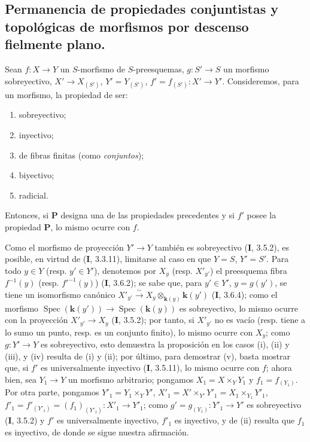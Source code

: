 \subsection{Permanencia de propiedades conjuntistas y topológicas de morfismos
por descenso fielmente plano.}
\label{subsection:IV.2.6-fr}

\begin{proposition}[2.6.1]
Sean $f:X\to Y$ un $S$-morfismo de $S$-preesquemas, $g:S'\to S$ un
morfismo sobreyectivo, $X'\to X_{(S')}$, $Y'=Y_{(S')}$,
$f'=f_{(S')}:X'\to Y'$. Consideremos, para un morfismo, la propiedad de ser:
\begin{enumerate}
\item[\textup{(i)}] sobreyectivo;
\item[\textup{(ii)}] inyectivo;
\item[\textup{(iii)}] de fibras finitas \textup{(como \emph{conjuntos})};
\item[\textup{(iv)}] biyectivo;
\item[\textup{(v)}] radicial.
\end{enumerate}
Entonces, si $\boldsymbol{P}$ designa una de las propiedades precedentes y si $f'$ posee la
propiedad $\boldsymbol{P}$, lo mismo ocurre con $f$.
\end{proposition}

Como el morfismo de proyección $Y'\to Y$ también es sobreyectivo (\textbf I, 3.5.2),
es posible, en virtud de (\textbf I, 3.3.11), limitarse al caso en que $Y=S$,
$Y'=S'$. Para todo $y\in Y$ (resp. $y'\in Y'$), denotemos por $X_y$ (resp.
$X'_{y'}$) el preesquema fibra $f^{-1}(y)$ (resp. $f'^{-1}(y)$) (\textbf I, 3.6.2);
se sabe que, para $y'\in Y'$, $y=g(y')$, se tiene un isomorfismo canónico $X'_{y'}\xrightarrow{\sim}X_y\otimes_{\mathbf{k}(y)}\boldsymbol{k}(y')$ (\textbf{I}, 3.6.4);
como el morfismo $\operatorname{Spec}(\boldsymbol{k}(y'))\to\operatorname{Spec}(\boldsymbol{k}(y))$
es sobreyectivo, lo mismo ocurre con la proyección $X'_{y'}\to X_y$
(\textbf I, 3.5.2); por tanto, si $X'_{y'}$ no es vacío (resp. tiene a lo sumo un
punto, resp. es un conjunto finito), lo mismo ocurre con $X_y$; como
$g:Y'\to Y$ es sobreyectivo, esto demuestra la proposición en los casos (i),
(ii) y (iii), y (iv) resulta de (i) y (ii); por último, para demostrar (v),
basta mostrar que, si $f'$ es universalmente inyectivo (\textbf I, 3.5.11), lo mismo
ocurre con $f$; ahora bien, sea $Y_1\to Y$ un morfismo arbitrario; pongamos
$X_1=X\times_Y Y_1$ y $f_1=f_{(Y_1)}$. Por otra parte, pongamos $Y'_1=Y_1\times_Y Y'$, $X'_1=X'\times_{Y'}Y'_1=X_1\times_{Y_1}Y'_1$, $f'_1=f'_{(Y'_1)}=(f_1)_{(Y'_1)}:X'_1\to Y'_1$;
como $g'=g_{(Y_1)}:Y'_1\to Y'$ es sobreyectivo (\textbf I, 3.5.2) y $f'$ es
universalmente inyectivo, $f'_1$ es inyectivo, y de (ii) resulta que
$f_1$ es inyectivo, de donde se sigue nuestra afirmación.

